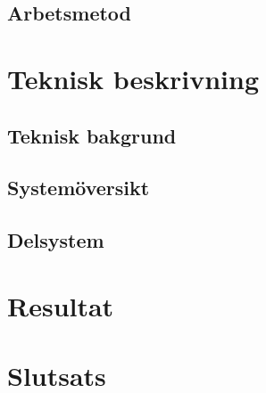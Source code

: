 \documentclass[a4paper]{article}
\begin{document}

\subsection{Arbetsmetod}



\section{Teknisk beskrivning}

\subsection{Teknisk bakgrund}


\subsection{Systemöversikt}


\subsection{Delsystem}




\section{Resultat}




\section{Slutsats}



\newpage


\end{document}
